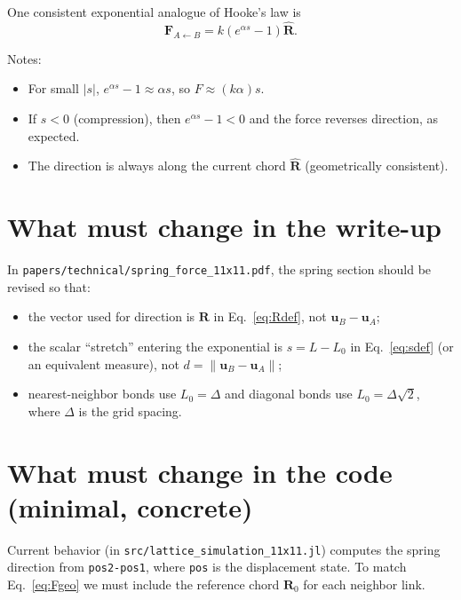 \documentclass[11pt,a4paper]{article}
\begin{document}
One consistent exponential analogue of Hooke's law is
\begin{equation}
\mathbf{F}_{A\leftarrow B} = k\left(e^{\alpha s}-1\right)\hat{\mathbf{R}}.
\label{eq:Fgeo}
\end{equation}

Notes:
\begin{itemize}
  \item For small $|s|$, $e^{\alpha s}-1\approx \alpha s$, so $F\approx (k\alpha)s$.
  \item If $s<0$ (compression), then $e^{\alpha s}-1<0$ and the force reverses direction, as expected.
  \item The direction is always along the current chord $\hat{\mathbf{R}}$ (geometrically consistent).
\end{itemize}

\section{What must change in the write-up}
In \texttt{papers/technical/spring\_force\_11x11.pdf}, the spring section should be revised so that:
\begin{itemize}
  \item the vector used for direction is $\mathbf{R}$ in Eq.~\eqref{eq:Rdef}, not $\mathbf{u}_B-\mathbf{u}_A$;
  \item the scalar ``stretch'' entering the exponential is $s=L-L_0$ in Eq.~\eqref{eq:sdef} (or an equivalent measure), not $d=\|\mathbf{u}_B-\mathbf{u}_A\|$;
  \item nearest-neighbor bonds use $L_0=\Delta$ and diagonal bonds use $L_0=\Delta\sqrt{2}$, where $\Delta$ is the grid spacing.
\end{itemize}

\section{What must change in the code (minimal, concrete)}
Current behavior (in \texttt{src/lattice\_simulation\_11x11.jl}) computes the spring direction from \texttt{pos2-pos1}, where \texttt{pos} is the displacement state. To match Eq.~\eqref{eq:Fgeo} we must include the reference chord $\mathbf{R}_0$ for each neighbor link.
\end{document}
